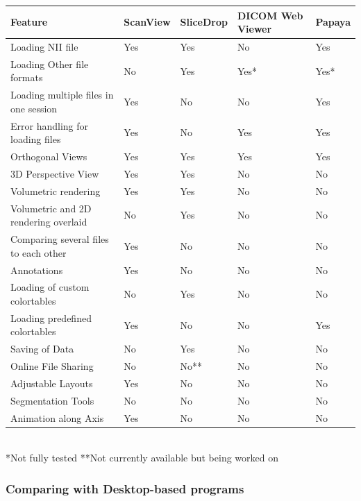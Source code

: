 \documentclass[a4paper,11pt,twoside]{article}
\begin{document}
\begin{center}

  \begin{tabular}{ | l | l | l | l | l |}
    \hline
    Feature & ScanView & SliceDrop & DICOM Web Viewer & Papaya \\ \hline \hline

Loading NII file & Yes & Yes & No & Yes\\ \hline
Loading Other file formats & No & Yes & Yes* & Yes*\\ \hline
Loading multiple files in one session & Yes & No & No & Yes \\ \hline
Error handling for loading files & Yes & No & Yes & Yes\\ \hline
Orthogonal Views & Yes & Yes & Yes & Yes\\ \hline
3D Perspective View & Yes & Yes & No & No \\ \hline
Volumetric rendering & Yes & Yes & No & No\\ \hline
Volumetric and 2D rendering overlaid & No & Yes & No & No \\ \hline
Comparing several files to each other & Yes & No & No & No\\ \hline
Annotations & Yes & No & No & No\\ \hline
Loading of custom colortables & No & Yes & No & No \\ \hline
Loading predefined colortables & Yes & No & No & Yes\\ \hline
Saving of Data & No & Yes & No & No\\ \hline
Online File Sharing & No & No** & No & No\\ \hline
Adjustable Layouts & Yes & No & No & No \\ \hline
Segmentation Tools & No & No & No & No \\ \hline
Animation along Axis & Yes & No & No & No \\ \hline

  \end{tabular}\\


*Not fully tested
**Not currently available but being worked on


\end{center}



\subsubsection{Comparing with Desktop-based programs}
\end{document}
